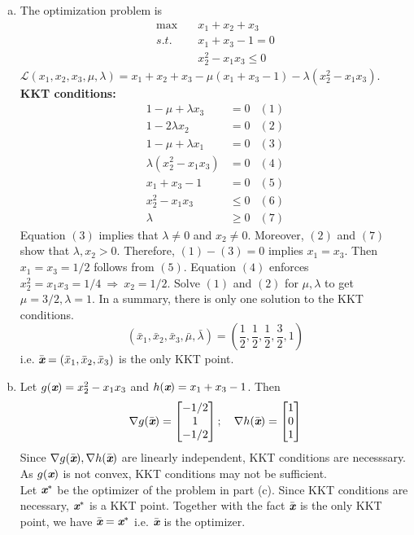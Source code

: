 \begin{enumerate}
\begin{enumerate}[(a)]
			\item The optimization problem is 
			\begin{align*}
			\max \quad &x_1+x_2+x_3\\
			s.t.\quad & x_1+x_3  - 1= 0\\
			&x_2^2 - x_1x_3\le 0
			\end{align*}
			$\mathcal{L}(x_1,x_2,x_3,\mu,\lambda) = x_1+x_2+x_3 - \mu (x_1+x_3-1) -\lambda(x_2^2-x_1x_3)$.~\\
			\textbf{KKT conditions:}
			\begin{align*}
			1 - \mu +\lambda x_3 &= 0&(1)\\
			1  - 2\lambda x_2 &=0&(2)\\
			1 -\mu + \lambda x_1 &=0&(3)\\
			\lambda (x_2^2-x_1x_3) &= 0&(4)\\
			x_1+x_3-1&=0&(5)\\
			x_2^2-x_1x_3&\le 0&(6)\\
			\lambda &\ge 0&(7) 
			\end{align*}
			Equation $(3)$ implies that $\lambda \neq 0$ and $x_2\neq 0$. Moreover, $(2)$ and $(7)$ show that $\lambda, x_2 >0$. 
			Therefore, $(1) - (3) =0$ implies $x_1=x_3$. Then $x_1=x_3 = 1/2$ follows from $(5)$.
			Equation $(4)$ enforces $x_2^2=x_1x_3  = 1/4 ~\Rightarrow~ x_2=1/2$. Solve $(1)$ and $(2)$ for $\mu, \lambda$ to get $\mu =3/2, \lambda= 1$. In a summary, there is only one solution to the KKT conditions.
			\[
			(\bar{x}_1,\bar{x}_2,\bar{x}_3,\bar{\mu},\bar{\lambda}) = \left( \frac{1}{2}, \frac{1}{2}, \frac{1}{2}, \frac{3}{2}, 1 \right)
			\]
			i.e. $\bar{\textit{\textbf{x}}} = (\bar{x}_1,\bar{x}_2,\bar{x}_3)$ is the only KKT point.
			
			\item Let $g(\textit{\textbf{x}}) = x_2^2-x_1x_3$ and $h(\textit{\textbf{x}}) = x_1+x_3-1$. Then
			\[
			\nabla g(\bar{\textit{\textbf{x}}}) = \begin{bmatrix}
			-1/2\\ 1 \\ -1/2
			\end{bmatrix};~~~\nabla h(\bar{\textit{\textbf{x}}}) =\begin{bmatrix}
			1 \\ 0 \\1
			\end{bmatrix}
			\]
			Since $\nabla g(\bar{\textit{\textbf{x}}}), \nabla h(\bar{\textit{\textbf{x}}})$ are linearly independent, KKT conditions are necesssary. As $g(\textit{\textbf{x}})$ is not convex, KKT conditions may not be sufficient. ~\\
			Let $\textit{\textbf{x}}^*$ be the optimizer of the problem in part (c). Since KKT conditions are necessary, $\textit{\textbf{x}}^*$ is a KKT point. Together with the fact $\bar{\textit{\textbf{x}}}$ is the only KKT point, we have $\bar{\textit{\textbf{x}}} = \textit{\textbf{x}}^*$ i.e. $\bar{\textit{\textbf{x}}}$ is the optimizer.
		\end{enumerate}
	

\end{enumerate}
